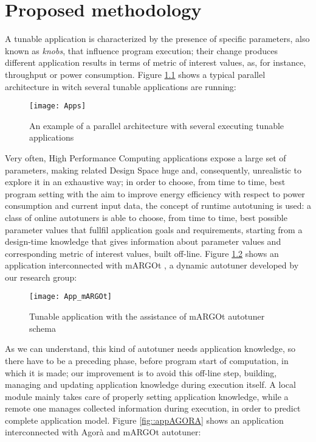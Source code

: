 \chapter{Proposed methodology}

\lettrine{A}{} tunable application is characterized by the presence of specific parameters, also known as \textit{knobs}, that influence program execution; their change produces different application results in terms of metric of interest values, as, for instance, throughput or power consumption. Figure \ref{fig::appDef} shows a typical parallel architecture in witch several tunable applications are running:

\begin{figure}[H]

    \centering
    \texttt{[image: Apps]}
    \caption{An example of a parallel architecture with several executing tunable applications}
    \label{fig::appDef}
    
\end{figure}

Very often, High Performance Computing applications expose a large set of parameters, making related Design Space huge and, consequently, unrealistic to explore it in an exhaustive way; in order to choose, from time to time, best program setting with the aim to improve energy efficiency with respect to power consumption and current input data, the concept of runtime autotuning is used: a class of online autotuners is able to choose, from time to time, best possible parameter values that fullfil application goals and requirements, starting from a design-time knowledge that gives information about parameter values and corresponding metric of interest values, built off-line. Figure \ref{fig::appAut} shows an application interconnected with mARGOt \cite{gadioli2015application}, a dynamic autotuner developed by our research group:

\begin{figure}[H]

    \centering
    \texttt{[image: App\_mARGOt]}
    \caption{Tunable application with the assistance of mARGOt autotuner schema}
    \label{fig::appAut}
    
\end{figure}

As we can understand, this kind of autotuner needs application knowledge, so there have to be a preceding phase, before program start of computation, in which it is made; our improvement is to avoid this off-line step, building, managing and updating application knowledge during execution itself. A local module mainly takes care of properly setting application knowledge, while a remote one manages collected information during execution, in order to predict complete application model. Figure \ref{fig::appAGORA} shows an application interconnected with Agorà and mARGOt autotuner:

